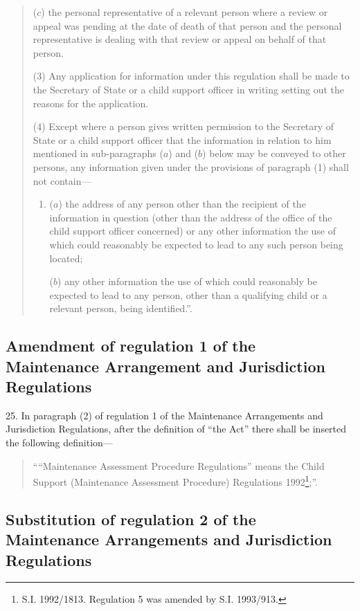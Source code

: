 \documentclass[a4paper]{article}
\begin{document}
\begin{quotation}
\begin{enumerate}
($c$) the personal representative of a relevant person where a review or appeal was pending at the date of death of that person and the personal representative is dealing with that review or appeal on behalf of that person.
\end{enumerate}

(3) Any application for information under this regulation shall be made to the Secretary of State or a child support officer in writing setting out the reasons for the application.

(4) Except where a person gives written permission to the Secretary of State or a child support officer that the information in relation to him mentioned in sub-paragraphs ($a$) and ($b$) below may be conveyed to other persons, any information given under the provisions of paragraph (1) shall not contain—
\begin{enumerate}\item[]
($a$) the address of any person other than the recipient of the information in question (other than the address of the office of the child support officer concerned) or any other information the use of which could reasonably be expected to lead to any such person being located;

($b$) any other information the use of which could reasonably be expected to lead to any person, other than a qualifying child or a relevant person, being identified.”.
\end{enumerate}
\end{quotation}

\subsection[25. Amendment of regulation 1 of the Maintenance Arrangement and Jurisdiction Regulations]{Amendment of regulation 1 of the Maintenance Arrangement and Jurisdiction Regulations}

25.  In paragraph (2) of regulation 1 of the Maintenance Arrangements and Jurisdiction Regulations, after the definition of “the Act” there shall be inserted the following definition—
\begin{quotation}
““Maintenance Assessment Procedure Regulations” means the Child Support (Maintenance Assessment Procedure) Regulations 1992\footnote{\frenchspacing S.I. 1992/1813. Regulation 5 was amended by S.I. 1993/913.};”.
\end{quotation}

\subsection[26. Substitution of regulation 2 of the Maintenance Arrangements and Jurisdiction Regulations]{Substitution of regulation 2 of the Maintenance Arrangements and Jurisdiction Regulations}
\end{document}
